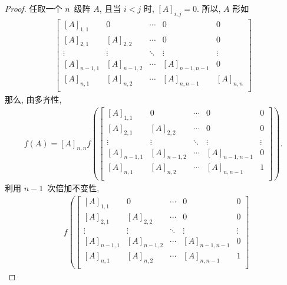 \begin{proof}
    任取一个 \(n\)~级阵 \(A\),
    且当 \(i < j\) 时, \([A]_{i,j} = 0\).
    所以, \(A\) 形如
    \begin{align*}
        \begin{bmatrix}
            [A]_{1,1}   & 0           & \cdots & 0             & 0         \\
            [A]_{2,1}   & [A]_{2,2}   & \cdots & 0             & 0         \\
            \vdots      & \vdots      & \ddots & \vdots        & \vdots    \\
            [A]_{n-1,1} & [A]_{n-1,2} & \cdots & [A]_{n-1,n-1} & 0         \\
            [A]_{n,1}   & [A]_{n,2}   & \cdots & [A]_{n,n-1}   & [A]_{n,n} \\
        \end{bmatrix}
    \end{align*}
    那么, 由多齐性,
    \begin{align*}
        f(A) = [A]_{n,n}
        f\left(
        \begin{bmatrix}
                [A]_{1,1}   & 0           & \cdots & 0             & 0      \\
                [A]_{2,1}   & [A]_{2,2}   & \cdots & 0             & 0      \\
                \vdots      & \vdots      & \ddots & \vdots        & \vdots \\
                [A]_{n-1,1} & [A]_{n-1,2} & \cdots & [A]_{n-1,n-1} & 0      \\
                [A]_{n,1}   & [A]_{n,2}   & \cdots & [A]_{n,n-1}   & 1      \\
            \end{bmatrix}
        \right).
    \end{align*}
    利用 \(n-1\)~次倍加不变性,
    \begin{align*}
             &
        f\left(
        \begin{bmatrix}
                [A]_{1,1}   & 0           & \cdots & 0             & 0      \\
                [A]_{2,1}   & [A]_{2,2}   & \cdots & 0             & 0      \\
                \vdots      & \vdots      & \ddots & \vdots        & \vdots \\
                [A]_{n-1,1} & [A]_{n-1,2} & \cdots & [A]_{n-1,n-1} & 0      \\
                [A]_{n,1}   & [A]_{n,2}   & \cdots & [A]_{n,n-1}   & 1      \\

\end{bmatrix}
\end{align*}
\end{proof}
